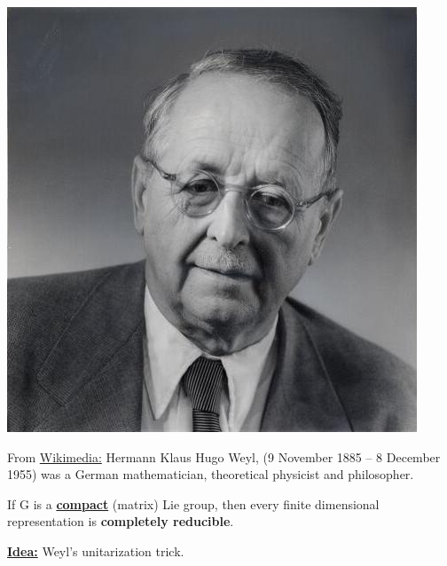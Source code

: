 \documentclass[../main.tex]{subfiles}
\begin{document}
\begin{marginfigure}
	\includegraphics[width=1.2\linewidth]{images/Hermann_Weyl_ETH-Bib_Portr_00890.jpg}
	\caption[Photo of Hermann Klaus Hugo Weyl]{From \href{https://commons.wikimedia.org/wiki/File:Hermann_Weyl_ETH-Bib_Portr_00890.jpg}{Wikimedia:} Hermann Klaus Hugo Weyl, (9 November 1885 – 8 December 1955) was a German mathematician, theoretical physicist and philosopher.}
\end{marginfigure}
\begin{theorem}[Weyl]
If G is a \underline{\textbf{compact}} (matrix) Lie group, then every finite dimensional representation is \textbf{completely reducible}.
\end{theorem}
 \underline{\textbf{Idea:}} Weyl's unitarization trick.
\end{document}
